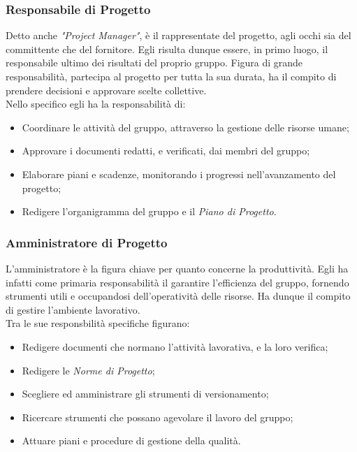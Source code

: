 \subsubsection{Responsabile di Progetto}
	Detto anche \textit{"Project Manager"}, è il rappresentate del progetto, agli occhi sia del committente che del 			fornitore. Egli risulta dunque essere, in primo luogo, il responsabile ultimo dei risultati del proprio gruppo. 			Figura di grande responsabilità, partecipa al progetto per tutta la sua durata, ha il compito di prendere 						decisioni 	e approvare scelte collettive.\\
	Nello specifico egli ha la responsabilità di:
	\begin{itemize}
	\item Coordinare le attività del gruppo, attraverso la gestione delle risorse umane;
	\item Approvare i documenti redatti, e verificati, dai membri del gruppo;
	\item Elaborare piani e scadenze, monitorando i progressi nell'avanzamento del progetto;
	\item Redigere l'organigramma del gruppo e il \textit{Piano di Progetto}.
	\end{itemize}

\subsubsection{Amministratore di Progetto}
	L'amministratore è la figura chiave per quanto concerne la produttività. Egli ha infatti come primaria 							responsabilità il garantire l'efficienza del gruppo, fornendo strumenti utili e occupandosi dell'operatività 				delle risorse. Ha dunque il compito di gestire l'ambiente lavorativo.\\
	Tra le sue responsbilità specifiche figurano:
	\begin{itemize}
	\item Redigere documenti che normano l'attività lavorativa, e la loro verifica\glossario;
	\item Redigere le \textit{Norme di Progetto};
	\item Scegliere ed amministrare gli strumenti di versionamento\glossario;
	\item Ricercare strumenti che possano agevolare il lavoro del gruppo;
	\item Attuare piani e procedure di gestione della qualità\glossario.
	\end{itemize}

